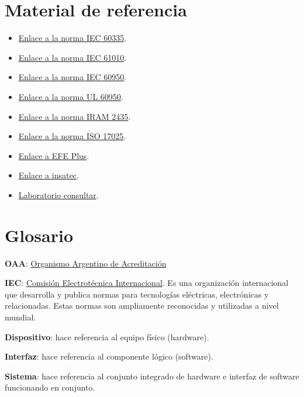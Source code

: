 \documentclass[a4paper,12pt]{article}
\begin{document}
\section{Material de referencia}
 \begin{itemize}
    \item \href{http://u.dianyuan.com/bbs/u/35/1131687973.pdf}{Enlace a la norma IEC 60335}.
\item \href{https://cdn.standards.iteh.ai/samples/22220/a6c5cee6104548a68e3719a79066c2c4/IEC-61010-1-2010-AMD1-2016.pdf}{Enlace a la norma IEC 61010}.

    \item \href{http://u.dianyuan.com/bbs/u/35/1131687973.pdf}{Enlace a la norma IEC 60950}.

    \item \href{http://u.dianyuan.com/bbs/u/28/1113472747.pdf}{Enlace a la norma UL 60950}.

   \item  \href{https://es.scribd.com/document/709573959/Norma-IRAM-2435-199411}{Enlace a la norma IRAM 2435}.
    \item \href{https://www.argentina.gob.ar/sites/default/files/doc22.pdf}{Enlace a la norma ISO 17025}.

    \item \href{https://www.seguridadelectrica.com/EFE-Plus-equipo-para-ensayos-de-seguridad-electrica.php}{Enlace a EFE Plus}.

    \item \href{https://www.insatecsl.com/hal104.htm}{Enlace a insatec}.
    \item \href{https://www.laboratorioconsultar.com/}{Laboratorio consultar}.

\end{itemize}

\section{Glosario}
\textbf{OAA}: \href{https://oaa.org.ar/}{Organismo Argentino de Acreditación}

\noindent \textbf{IEC}:  \href{https://www.iec.ch/understanding-standards}{Comisión Electrotécnica Internacional}. Es una organización internacional que desarrolla y publica normas para tecnologías eléctricas, electrónicas y relacionadas. Estas normas son ampliamente reconocidas y utilizadas a nivel mundial.

\noindent \textbf{Dispositivo}: hace referencia al equipo físico (hardware).

\noindent \textbf{Interfaz}: hace referencia al componente lógico (software).

\noindent \textbf{Sistema}: hace referencia al conjunto integrado de hardware e interfaz de software funcionando en conjunto.
\end{document}
